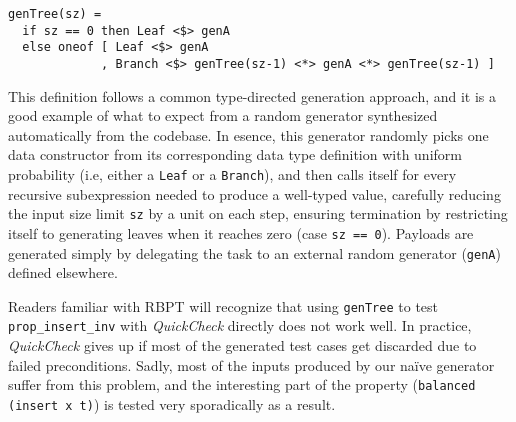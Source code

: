 \documentclass[sigconf, anonymous, review]{acmart}
\newcommand{\quickcheck}{\textit{QuickCheck}\xspace}
\begin{document}



\begin{verbatim}
genTree(sz) =
  if sz == 0 then Leaf <$> genA
  else oneof [ Leaf <$> genA
             , Branch <$> genTree(sz-1) <*> genA <*> genTree(sz-1) ]
\end{verbatim}

\noindent This definition follows a common type-directed generation approach,
and it is a good example of what to expect from a random generator synthesized
automatically from the codebase.
%
In esence, this generator randomly picks one data constructor from its
corresponding data type definition with uniform probability (i.e, either a
\texttt{Leaf} or a \texttt{Branch}), and then calls itself for every recursive
subexpression needed to produce a well-typed value, carefully reducing the input
size limit \texttt{sz} by a unit on each step, ensuring termination by
restricting itself to generating leaves when it reaches zero (case \texttt{sz ==
  0}).
%
Payloads are generated simply by delegating the task to an external random
generator (\texttt{genA}) defined elsewhere.
%


Readers familiar with RBPT will recognize that using \texttt{genTree} to test
\texttt{prop\_insert\_inv} with \quickcheck directly does not work well.
%
In practice, \quickcheck gives up if most of the generated test cases get
discarded due to failed preconditions.
%
%
Sadly, most of the inputs produced by our na\"ive generator suffer from this
problem, and the interesting part of the property (\texttt{balanced (insert x
  t)}) is tested very sporadically as a result.
\end{document}
